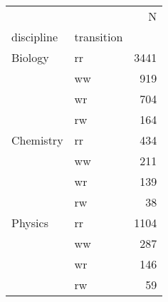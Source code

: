 \begin{tabular}{llr}
\toprule
        &    &     N \\
discipline & transition &       \\
\midrule
Biology & rr &  3441 \\
        & ww &   919 \\
        & wr &   704 \\
        & rw &   164 \\
Chemistry & rr &   434 \\
        & ww &   211 \\
        & wr &   139 \\
        & rw &    38 \\
Physics & rr &  1104 \\
        & ww &   287 \\
        & wr &   146 \\
        & rw &    59 \\
\bottomrule
\end{tabular}
